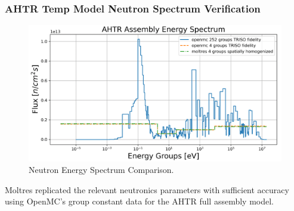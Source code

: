 \begin{frame}
    \frametitle{AHTR Temp Model Neutron Spectrum Verification}
            \begin{figure}[]
                \centering
                \includegraphics[width=0.7\linewidth]{figures/benchmark-spectrum.png} 
                \caption{Neutron Energy Spectrum Comparison.}
            \end{figure}
        Moltres replicated the relevant neutronics parameters with sufficient accuracy
        using OpenMC's group constant data for the AHTR full assembly model.
\end{frame}

